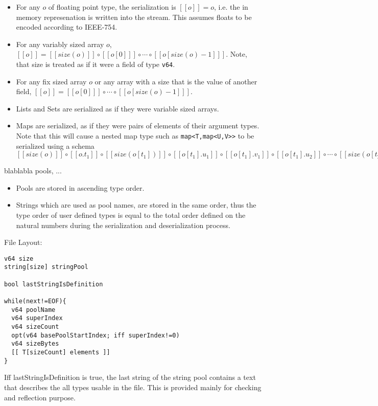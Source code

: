 \documentclass[a4paper,10pt]{article}
\newcommand{\den}[1]{[\![#1]\!]}
\begin{document}
\begin{itemize}
 \item For any $o$ of floating point type, the serialization is $\den{o} = o$, i.e. the in memory represenation is written into the stream. This assumes floats to be encoded according to IEEE-754.
 
 \item For any variably sized array $o$, $\den{o} = \den{size(o)} \circ \den{o[0]} \circ \cdots \circ \den{o[size(o)-1]}$. Note, that size is treated as if it were a field of type \texttt{v64}.
 \item For any fix sized array $o$ or any array with a size that is the value of another field, $\den{o} = \den{o[0]} \circ \cdots \circ \den{o[size(o)-1]}$.
 
 \item Lists and Sets are serialized as if they were variable sized arrays.
 
 \item Maps are serialized, as if they were pairs of elements of their argument types. Note that this will cause a nested map type such as \verb/map<T,map<U,V>>/ to be serialized using a schema $ \den{size(o)} \circ \den{o.t_1} \circ \den{size(o[t_1])} \circ \den{o[t_1].u_1} \circ \den{o[t_1].v_1} \circ \den{o[t_1].u_2} \circ \cdots \circ \den{size(o[t_2])} \circ \cdots \circ \den{o[t_n].v_m}$
\end{itemize}
 
blablabla pools, ...

\begin{itemize}
 \item Pools are stored in ascending type order.
 \item Strings which are used as pool names, are stored in the same order, thus the type order of user defined types is equal to the total order defined on the natural numbers during the serialization and deserialization process.
\end{itemize}


File Layout:

\begin{verbatim}
v64 size
string[size] stringPool

bool lastStringIsDefinition

while(next!=EOF){
  v64 poolName
  v64 superIndex
  v64 sizeCount
  opt(v64 basePoolStartIndex; iff superIndex!=0)
  v64 sizeBytes
  [[ T[sizeCount] elements ]]
}
\end{verbatim}

Iff lastStringIsDefinition is true, the last string of the string pool contains a text that describes the all types usable in the file. This is provided mainly for checking and reflection purpose.
\end{document}
